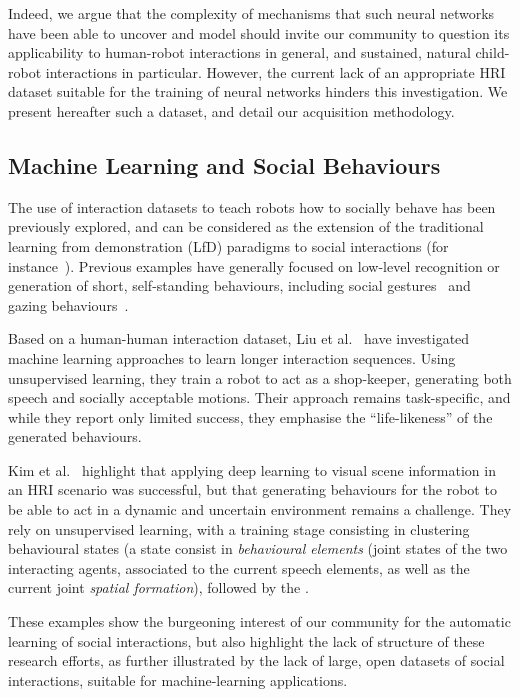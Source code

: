 \documentclass{article}
\newcommand{\etal}{et al.\xspace}
\begin{document}
Indeed, we argue that the complexity of mechanisms that such neural networks
have been able to uncover and model should invite our community to question its
applicability to human-robot interactions in general, and sustained, natural
child-robot interactions in particular.
However, the current lack of an appropriate HRI dataset suitable for the training of
neural networks hinders this investigation. We present hereafter such a dataset,
and detail our acquisition methodology.

\subsection*{Machine Learning and Social Behaviours}

The use of interaction datasets to teach robots how to socially behave has been
previously explored, and can be considered as the extension of the traditional
learning from demonstration (LfD) paradigms to social interactions (for
instance~\cite{nehaniv2007imitation,mohammad2015interaction}). Previous examples
have generally focused on low-level recognition or generation of short,
self-standing behaviours, including social gestures~\cite{nagai2005learning} and
gazing behaviours~\cite{calinon2006teaching}.

Based on a human-human interaction dataset, Liu \etal~\cite{liu2014how} have
investigated machine learning approaches to learn longer interaction sequences.
Using unsupervised learning, they train a robot to act as a shop-keeper,
generating both speech and socially acceptable motions. Their approach remains
task-specific, and while they report only limited success, they emphasise the
``life-likeness'' of the generated behaviours.

Kim \etal~\cite{kim2015pororobot} highlight that applying deep learning to
visual scene information in an HRI scenario was successful, but that
generating behaviours for the robot to be able to act in a dynamic and uncertain
environment remains a challenge.
They rely on unsupervised learning, with a
training stage consisting in clustering behavioural states (a state consist in
\emph{behavioural elements} (joint states of the two interacting agents,
associated to the current speech elements, as well as the current joint
\emph{spatial formation}), followed by the .

These examples show the burgeoning interest of our community for the automatic
learning of social interactions, but also highlight the lack of structure of
these research efforts, as further illustrated by the lack of large, open
datasets of social interactions, suitable for machine-learning applications.
\end{document}
